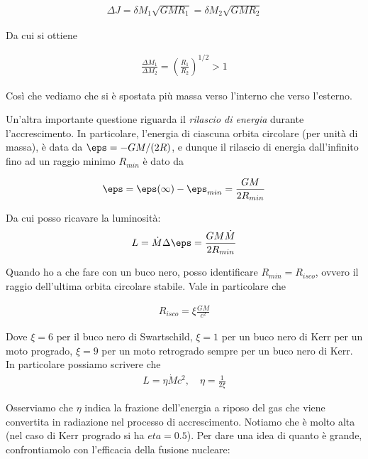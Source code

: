 \documentclass{report}
\begin{document}
\begin{align}
    \Delta J = \delta M_1 \sqrt{GM R_1} = \delta M_2 \sqrt{GMR_2}
\end{align}

Da cui si ottiene  

\begin{align}
    \frac{\Delta M_1}{\Delta M_2} = \left(\frac{R_1}{R_2}\right)^{1/2} > 1
\end{align}

Così che vediamo che si è spostata più massa verso l'interno che verso l'esterno. 

Un'altra importante questione riguarda il \emph{rilascio di energia} durante l'accrescimento. In particolare, l'energia di ciascuna orbita circolare (per unità di massa), è data da \(\eps = -GM/(2R)\), e dunque il rilascio di energia dall'infinito fino ad un raggio minimo \(R_{min}\) è dato da 

\begin{align}
    \eps = \eps(\infty) - \eps_{min} = \frac{GM}{2R_{min}}
\end{align}

Da cui posso ricavare la luminosità: 
\begin{align}
    L = \dot{M}\Delta \eps = \frac{GM \dot{M}}{2R_{min}}
\end{align}

Quando ho a che fare con un buco nero, posso identificare \(R_{min} = R_{isco}\), ovvero il raggio dell'ultima orbita circolare stabile. Vale in particolare che 

\begin{align}
    R_{isco} = \xi \frac{GM}{c^2}
\end{align}

Dove \(\xi = 6\) per il buco nero di Swartschild, \(\xi = 1\) per un buco nero di Kerr per un moto progrado, \(\xi = 9\) per un moto retrogrado sempre per un buco nero di Kerr. \\

In particolare possiamo scrivere che 
\begin{align}
    L = \eta \dot{M}c^2, \quad \eta = \frac{1}{2\xi}
\end{align}

Osserviamo che \(\eta\) indica la frazione dell'energia a riposo del gas che viene convertita in radiazione nel processo di accrescimento. Notiamo che è molto alta (nel caso di Kerr progrado si ha \(eta =0.5\)). Per dare una idea di quanto è grande, confrontiamolo con l'efficacia della fusione nucleare: 
\end{document}
